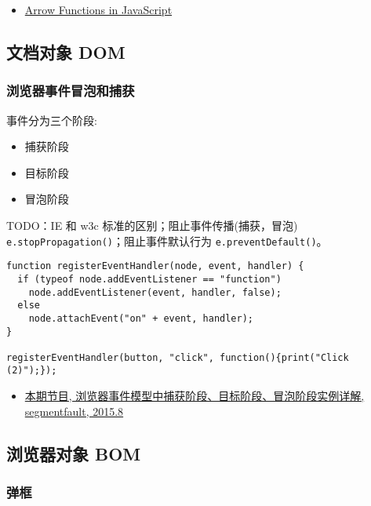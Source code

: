 \begin{itemize}
\tightlist
\item
  \href{https://tylermcginnis.com/arrow-functions/}{Arrow Functions in
  JavaScript}
\end{itemize}

\subsection{文档对象 DOM}\label{ux6587ux6863ux5bf9ux8c61-dom}

\subsubsection{浏览器事件冒泡和捕获}\label{ux6d4fux89c8ux5668ux4e8bux4ef6ux5192ux6ce1ux548cux6355ux83b7}

事件分为三个阶段:

\begin{itemize}
\tightlist
\item
  捕获阶段
\item
  目标阶段
\item
  冒泡阶段
\end{itemize}

TODO：IE 和 w3c 标准的区别；阻止事件传播(捕获，冒泡)
\lstinline!e.stopPropagation()!；阻止事件默认行为
\lstinline!e.preventDefault()!。

\begin{lstlisting}
function registerEventHandler(node, event, handler) {
  if (typeof node.addEventListener == "function")
    node.addEventListener(event, handler, false);
  else
    node.attachEvent("on" + event, handler);
}

registerEventHandler(button, "click", function(){print("Click (2)");});
\end{lstlisting}

\begin{itemize}
\tightlist
\item
  \href{http://segmentfault.com/a/1190000003482372}{本期节目,
  浏览器事件模型中捕获阶段、目标阶段、冒泡阶段实例详解, segmentfault,
  2015.8}
\end{itemize}

\subsection{浏览器对象 BOM}\label{ux6d4fux89c8ux5668ux5bf9ux8c61-bom}

\subsubsection{弹框}\label{ux5f39ux6846}

